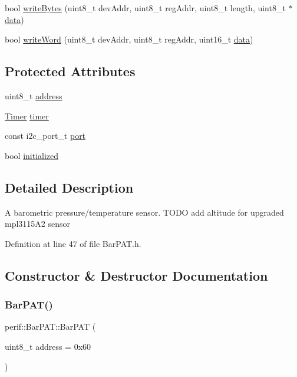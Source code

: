 \begin{DoxyCompactItemize}
\item 
bool \mbox{\hyperlink{classI2Cdev_aa4e39cac6c0eac5112f9132084bcc93e}{write\+Bytes}} (uint8\+\_\+t dev\+Addr, uint8\+\_\+t reg\+Addr, uint8\+\_\+t length, uint8\+\_\+t $\ast$\mbox{\hyperlink{classperif_1_1PerifBase_a1a3afaa535fda17e9f97123fffe78765}{data}})
\item 
bool \mbox{\hyperlink{classI2Cdev_acbe68a802d6a177301736e60bedd1def}{write\+Word}} (uint8\+\_\+t dev\+Addr, uint8\+\_\+t reg\+Addr, uint16\+\_\+t \mbox{\hyperlink{classperif_1_1PerifBase_a1a3afaa535fda17e9f97123fffe78765}{data}})
\end{DoxyCompactItemize}
\subsection*{Protected Attributes}
\begin{DoxyCompactItemize}
\item 
uint8\+\_\+t \mbox{\hyperlink{classperif_1_1I2CPerif_a3275bcc89b3d8ddfa221fb76669c2d45}{address}}
\item 
\mbox{\hyperlink{classTimer}{Timer}} \mbox{\hyperlink{classperif_1_1Perif_acfa1256201bead82ccce1a0a8bcc24e1}{timer}}
\item 
const i2c\+\_\+port\+\_\+t \mbox{\hyperlink{classI2Cdev_a1d1e63732aa9f50369172b27a034129c}{port}}
\item 
bool \mbox{\hyperlink{classI2Cdev_a94b914bfcbd0fe1f6fdd7b9c6f4ab921}{initialized}}
\end{DoxyCompactItemize}


\subsection{Detailed Description}
A barometric pressure/temperature sensor. T\+O\+DO add altitude for upgraded mpl3115\+A2 sensor 

Definition at line 47 of file Bar\+P\+A\+T.\+h.



\subsection{Constructor \& Destructor Documentation}
\mbox{\label{classperif_1_1BarPAT_ad927405b022fe8ce7c10b06c743aac10}} 
\subsubsection{\texorpdfstring{BarPAT()}{BarPAT()}}
{\footnotesize\ttfamily perif\+::\+Bar\+P\+A\+T\+::\+Bar\+P\+AT (\begin{DoxyParamCaption}\item[{uint8\+\_\+t}]{address = {\ttfamily 0x60} }\end{DoxyParamCaption})\hspace{0.3cm}{\ttfamily [explicit]}}

